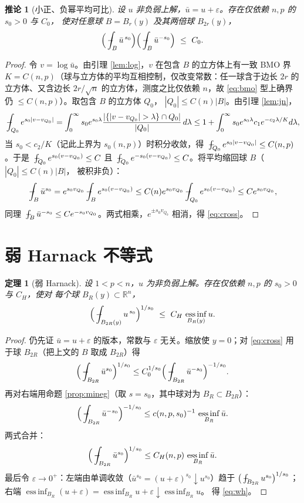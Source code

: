 \documentclass[11pt]{ctexart}
\newcommand{\fint}{\,\rlap{$-$}\!\int}
\newcommand{\R}{\mathbb{R}}
\DeclareMathOperator*{\essinf}{ess\,inf}
\newcommand{\ub}{\bar{u}}
\newcommand{\eps}{\varepsilon}
\theoremstyle{plain}
\newtheorem{theorem}{定理}
\newtheorem{corollary}{推论}
\theoremstyle{definition}
\begin{document}
\begin{corollary}[小正、负幂平均可比]\label{cor:cross}
设 $u$ 非负弱上解，$\ub=u+\eps$。存在仅依赖 $n,p$ 的 $s_0>0$ 与 $C_0$，
使对任意球 $B=B_r(y)$ 及其两倍球 $B_{2r}(y)$，
\begin{equation}\label{eq:cross}
\Big(\fint_{B}\ub^{\,s_0}\Big)\Big(\fint_{B}\ub^{-s_0}\Big)\ \le\ C_0 .
\end{equation}
\end{corollary}

\begin{proof}
令 $v=\log\ub$。由引理 \ref{lem:log}，$v$ 在包含 $B$ 的立方体上有一致 BMO
界 $K=C(n,p)$（球与立方体的平均互相控制，仅改变常数：任一球含于边长
$2r$ 的立方体、又含边长 $2r/\sqrt n$ 的立方体，测度之比仅依赖 $n$，故
\eqref{eq:bmo} 型上确界仍 $\le C(n,p)$）。取包含 $B$ 的立方体 $Q_0$，
$|Q_0|\le C(n)|B|$。由引理 \ref{lem:jn}，
\[
\fint_{Q_0}e^{s_0|v-v_{Q_0}|}
=\int_0^\infty s_0e^{s_0\lambda}\frac{|\{|v-v_{Q_0}|>\lambda\}\cap Q_0|}{|Q_0|}\,d\lambda
\le1+\int_0^\infty s_0e^{s_0\lambda}c_1e^{-c_2\lambda/K}d\lambda,
\]
当 $s_0<c_2/K$（记此上界为 $s_0(n,p)$）时积分收敛，得
$\fint_{Q_0}e^{s_0|v-v_{Q_0}|}\le C(n,p)$。于是
$\fint_{Q_0}e^{s_0(v-v_{Q_0})}\le C$ 且
$\fint_{Q_0}e^{-s_0(v-v_{Q_0})}\le C$。将平均缩回球 $B$（$|Q_0|\le C(n)|B|$，
被积非负）：
\[
\fint_{B}\ub^{s_0}=e^{s_0v_{Q_0}}\fint_B e^{s_0(v-v_{Q_0})}
\le C(n)e^{s_0v_{Q_0}}\fint_{Q_0}e^{s_0(v-v_{Q_0})}\le Ce^{s_0v_{Q_0}},
\]
同理 $\fint_B\ub^{-s_0}\le Ce^{-s_0v_{Q_0}}$。两式相乘，$e^{\pm s_0v_{Q_0}}$
相消，得 \eqref{eq:cross}。
\end{proof}

\section{弱 Harnack 不等式}

\begin{theorem}[弱 Harnack]\label{thm:weakharnack}
设 $1<p<n$，$u$ 为非负弱上解。存在仅依赖 $n,p$ 的 $s_0>0$ 与 $C_H$，使对
每个球 $B_R(y)\subset\R^n$，
\begin{equation}\label{eq:wh}
\Big(\fint_{B_{2R}(y)}u^{\,s_0}\Big)^{1/s_0}\ \le\ C_H\,\essinf_{B_R(y)}u .
\end{equation}
\end{theorem}

\begin{proof}
仍先证 $\ub=u+\eps$ 的版本，常数与 $\eps$ 无关。缩放使 $y=0$；对
\eqref{eq:cross} 用于球 $B_{2R}$（把上文的 $B$ 取成 $B_{2R}$）得
\[
\Big(\fint_{B_{2R}}\ub^{s_0}\Big)^{1/s_0}
\le C_0^{1/s_0}\Big(\fint_{B_{2R}}\ub^{-s_0}\Big)^{-1/s_0}.
\]
再对右端用命题 \ref{prop:mineg}（取 $s=s_0$，其中球对为
$B_R\subset B_{2R}$）：
\[
\Big(\fint_{B_{2R}}\ub^{-s_0}\Big)^{-1/s_0}
\le c(n,p,s_0)^{-1}\,\essinf_{B_R}\ub .
\]
两式合并：
\[
\Big(\fint_{B_{2R}}\ub^{s_0}\Big)^{1/s_0}
\le C_H(n,p)\,\essinf_{B_R}\ub .
\]
最后令 $\eps\to0^+$：左端由单调收敛（$\ub^{s_0}=(u+\eps)^{s_0}\downarrow
u^{s_0}$）趋于 $\big(\fint_{B_{2R}}u^{s_0}\big)^{1/s_0}$；右端
$\essinf_{B_R}(u+\eps)=\essinf_{B_R}u+\eps\downarrow\essinf_{B_R}u$。
得 \eqref{eq:wh}。
\end{proof}
\end{document}
